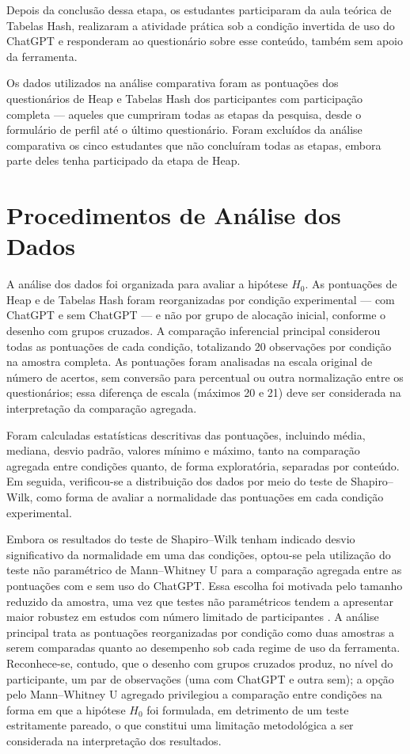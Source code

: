 Depois da conclusão dessa etapa, os estudantes participaram da aula teórica de Tabelas Hash, realizaram a atividade prática sob a condição invertida de uso do ChatGPT e responderam ao questionário sobre esse conteúdo, também sem apoio da ferramenta.

Os dados utilizados na análise comparativa foram as pontuações dos questionários de Heap e Tabelas Hash dos participantes com participação completa --- aqueles que cumpriram todas as etapas da pesquisa, desde o formulário de perfil até o último questionário. Foram excluídos da análise comparativa os cinco estudantes que não concluíram todas as etapas, embora parte deles tenha participado da etapa de Heap.

\section{Procedimentos de Análise dos Dados}
\label{sec:procedimentos-analise}

A análise dos dados foi organizada para avaliar a hipótese $H_{0}$. As pontuações de Heap e de Tabelas Hash foram reorganizadas por condição experimental --- com ChatGPT e sem ChatGPT --- e não por grupo de alocação inicial, conforme o desenho com grupos cruzados. A comparação inferencial principal considerou todas as pontuações de cada condição, totalizando 20 observações por condição na amostra completa. As pontuações foram analisadas na escala original de número de acertos, sem conversão para percentual ou outra normalização entre os questionários; essa diferença de escala (máximos 20 e 21) deve ser considerada na interpretação da comparação agregada.

Foram calculadas estatísticas descritivas das pontuações, incluindo média, mediana, desvio padrão, valores mínimo e máximo, tanto na comparação agregada entre condições quanto, de forma exploratória, separadas por conteúdo. Em seguida, verificou-se a distribuição dos dados por meio do teste de Shapiro--Wilk, como forma de avaliar a normalidade das pontuações em cada condição experimental.

Embora os resultados do teste de Shapiro--Wilk tenham indicado desvio significativo da normalidade em uma das condições, optou-se pela utilização do teste não paramétrico de Mann--Whitney U para a comparação agregada entre as pontuações com e sem uso do ChatGPT. Essa escolha foi motivada pelo tamanho reduzido da amostra, uma vez que testes não paramétricos tendem a apresentar maior robustez em estudos com número limitado de participantes \cite{kitchenham2019statistical,sheskin2003handbook}. A análise principal trata as pontuações reorganizadas por condição como duas amostras a serem comparadas quanto ao desempenho sob cada regime de uso da ferramenta. Reconhece-se, contudo, que o desenho com grupos cruzados produz, no nível do participante, um par de observações (uma com ChatGPT e outra sem); a opção pelo Mann--Whitney U agregado privilegiou a comparação entre condições na forma em que a hipótese $H_{0}$ foi formulada, em detrimento de um teste estritamente pareado, o que constitui uma limitação metodológica a ser considerada na interpretação dos resultados.

